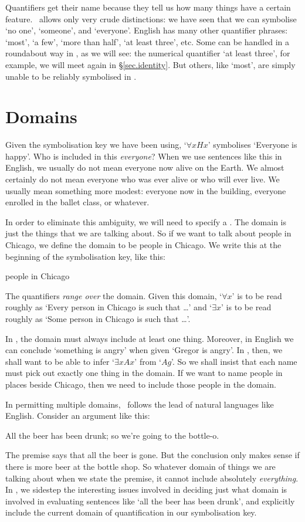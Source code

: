 Quantifiers get their name because they tell us how many things have a certain feature. \FOL\ allows only very crude distinctions: we have seen that we can symbolise `no one', `someone', and `everyone'. English has many other quantifier phrases: `most', `a few', `more than half', `at least three', etc. Some can be handled in a roundabout way in \FOL, as we will see: the numerical quantifier `at least three', for example, we will meet again in §\ref{sec.identity}. But others, like `most', are simply unable to be reliably symbolised in \FOL. 

\section{Domains}\label{sec_domains}
Given the symbolisation key we have been using, `$\forall xHx$' symbolises `Everyone is happy'.  Who is included in this \emph{everyone}? When we use sentences like this in English, we usually do not mean everyone now alive on the Earth. We almost certainly do not mean everyone who was ever alive or who will ever live. We usually mean something more modest: everyone now in the building, everyone enrolled in the ballet class, or whatever.

In order to eliminate this ambiguity, we will need to specify a . The domain is just the things that we are talking about. So if we want to talk about people in Chicago, we define the domain to be people in Chicago. We write this at the beginning of the symbolisation key, like this:
	\begin{ekey}
		\item[\text{domain}] people in Chicago
	\end{ekey}
The quantifiers \emph{range over} the domain. Given this domain, `$\forall x$' is to be read roughly as `Every person in Chicago is such that …' and `$\exists x$' is to be read roughly as `Some person in Chicago is such that …'. 

In \FOL, the domain must always include at least one thing. Moreover, in English we can conclude `something is angry' when given `Gregor is angry'. In \FOL, then, we shall want to be able to infer `$\exists x Ax$' from `$Ag$'. So we shall insist that each name must pick out exactly one thing in the domain. If we want to name people in places beside Chicago, then we need to include those people in the domain. 

In permitting multiple domains, \FOL\ follows the lead of natural languages like English. Consider an argument like this: \begin{earg}
	\item[\ex{ex.qdr}] All the beer has been drunk; so we're going to the bottle-o. 
\end{earg} The premise says that all the beer is gone. But the conclusion only makes sense if there is more beer at the bottle shop. So whatever domain of things we are talking about when we state the premise, it cannot include absolutely \emph{everything}. In \FOL, we sidestep the interesting issues involved in deciding just what domain is involved in evaluating sentences like `all the beer has been drunk', and explicitly include the current domain of quantification in our symbolisation key.

